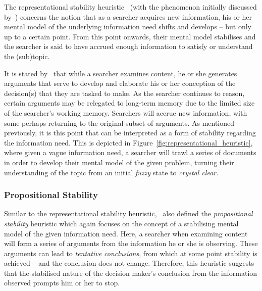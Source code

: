The representational stability heuristic~\citep{nickles1995judgment} (with the phenomenon initially discussed by~\cite{yates1982toward}) concerns the notion that as a searcher acquires new information, his or her mental model of the underlying information need shifts and develops -- but only up to a certain point. From this point onwards, their mental model stabilises and the searcher is said to have accrued enough information to satisfy or understand the (sub)topic.

It is stated by~\cite{nickles1995judgment} that while a searcher examines content, he or she generates arguments that serve to develop and elaborate his or her conception of the decision(s) that they are tasked to make. As the searcher continues to reason, certain arguments may be relegated to long-term memory due to the limited size of the searcher's working memory. Searchers will accrue new information, with some perhaps returning to the original subset of arguments. As mentioned previously, it is this point that can be interpreted as a form of stability regarding the information need. This is depicted in Figure~\ref{fig:representational_heuristic}, where given a vague information need, a searcher will trawl a series of documents in order to develop their mental model of the given problem, turning their understanding of the topic from an initial \emph{fuzzy} state to \emph{crystal clear.}

\vspace*{-4mm}
\subsubsection{Propositional Stability}\label{sec:stopping_background:heuristics:propositional}
Similar to the representational stability heuristic,~\cite{nickles1995judgment} also defined the \emph{propositional stability} heuristic which again focuses on the concept of a stabilising mental model of the given information need. Here, a searcher when examining content will form a series of arguments from the information he or she is observing. These arguments can lead to \emph{tentative conclusions}, from which at some point stability is achieved -- and the conclusion does not change. Therefore, this heuristic suggests that the stabilised nature of the decision maker's conclusion from the information observed prompts him or her to stop.

\vspace*{-4mm}
